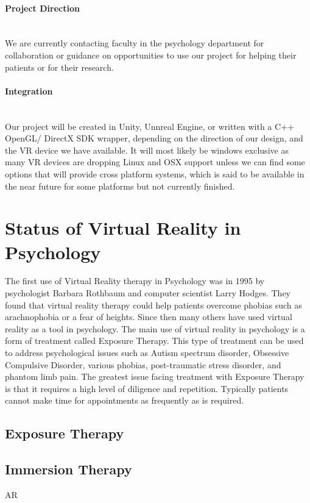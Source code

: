 \documentclass[a4paper,10pt]{article}
\begin{document}
	
	\paragraph{Project Direction} ~\\ We are currently contacting faculty in the psychology department for collaboration or guidance on opportunities to use our project for helping their patients or for their research.
	\paragraph{Integration} ~\\ Our project will be created in Unity, Unnreal Engine, or written with a C++ OpenGL/ DirectX SDK wrapper, depending on the direction of our design, and the VR device we have available. It will most likely be windows exclusive as many VR devices are dropping Linux and OSX support unless we can find some options that will provide cross platform systems, which is said to be available in the near future for some platforms but not currently finished.  
	
	\pagebreak
	
	\section{Status of Virtual Reality in Psychology}
	The first use of Virtual Reality therapy in Psychology was in 1995 by psychologist Barbara Rothbaum and computer scientist Larry Hodges. They found that virtual reality therapy could help patients overcome phobias such as arachnophobia or a fear of heights. Since then many others have used virtual reality as a tool in psychology. The main use of virtual reality in psychology is a form of treatment called Exposure Therapy. This type of treatment can be used to address psychological issues such as Autism spectrum disorder, Obsessive Compulsive Disorder, various phobias, post-traumatic stress disorder, and phantom limb pain. The greatest issue facing treatment with Exposure Therapy is that it requires a high level of diligence and repetition. Typically patients cannot make time for appointments as frequently as is required.
	
	\subsection{Exposure Therapy}
	\subsection{Immersion Therapy}
	AR
\end{document}
